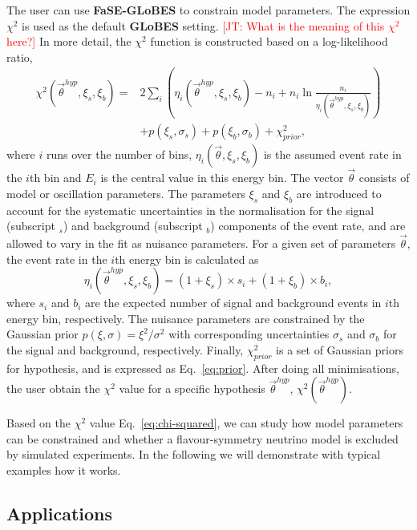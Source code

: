 \documentclass[aps,prd,nofootinbib,preprint]{revtex4}
\begin{document}
The user can use \textbf{FaSE-GLoBES} to constrain model parameters. The expression $\chi^2$ is used as the default \textbf{GLoBES} setting. \textcolor{red}{[JT: What is the meaning of this $\chi^2$ here?]} In more detail, the $\chi^2$ function is constructed based on a log-likelihood ratio,
\begin{align}\label{eq:chi-squared}
\chi^2(\vec{\theta}^{hyp},\xi_s,\xi_b)=&2\sum_i\left(\eta_i(\vec{\theta}^{hyp},\xi_s,\xi_b)-n_i+n_i\ln\frac{n_i}{\eta_i(\vec{\theta}^{hyp},\xi_s,\xi_b)} \right)\nonumber\\
&+p(\xi_s,\sigma_s)+p(\xi_b,\sigma_b)+\chi^2_{prior},
\end{align}
where $i$ runs over the number of bins, $\eta_i(\vec{\theta},\xi_s,\xi_b)$ is the assumed event rate in the $i$th bin and $E_i$ is the central value in this energy bin. The vector $\vec{\theta}$ consists of model or oscillation parameters. The parameters $\xi_s$ and $\xi_b$ are introduced to account for the systematic uncertainties in the normalisation for the signal (subscript $_s$) and background (subscript $_b$) components of the event rate, and are allowed to vary in the fit as nuisance parameters. For a given set of parameters $\vec{\theta}$, the event rate in the $i$th energy bin is calculated as\\
\begin{equation}
\eta_i(\vec{\theta}^{hyp},\xi_s,\xi_b)=(1+\xi_s)\times s_i+(1+\xi_b)\times b_i,
\end{equation}
where $s_i$ and $b_i$ are the expected number of signal and background events in $i$th energy bin, respectively. The nuisance parameters are constrained by the Gaussian prior $p(\xi,\sigma)=\xi^2/\sigma^2$ with corresponding uncertainties $\sigma_s$ and $\sigma_b$ for the signal and background, respectively. Finally, $\chi^2_{prior}$ is a set of Gaussian priors for hypothesis, and is expressed as Eq.~\ref{eq:prior}. After doing all minimisations, the user obtain the $\chi^2$ value for a specific hypothesis $\vec{\theta}^{hyp}$, $\chi^2(\vec{\theta}^{hyp})$.


Based on the $\chi^2$ value Eq.~\ref{eq:chi-squared}, we can study how model parameters can be constrained and whether a flavour-symmetry neutrino model is excluded by simulated experiments. In the following we will demonstrate with typical examples how it works.

\subsection*{Applications}
\end{document}
